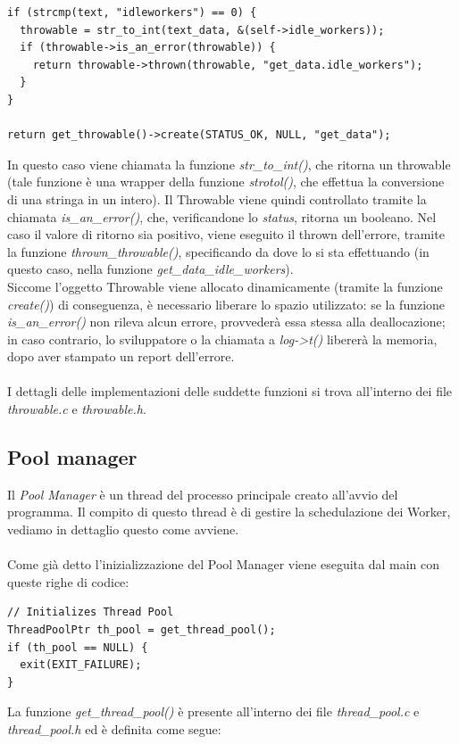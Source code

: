 \documentclass[italian]{tktltiki2}
\begin{document}
\begin{lstlisting}
if (strcmp(text, "idleworkers") == 0) {
  throwable = str_to_int(text_data, &(self->idle_workers));
  if (throwable->is_an_error(throwable)) {
    return throwable->thrown(throwable, "get_data.idle_workers");
  }
}

return get_throwable()->create(STATUS_OK, NULL, "get_data");
\end{lstlisting}
In questo caso viene chiamata la funzione \emph{str\_to\_int()}, che ritorna un throwable (tale funzione è una wrapper della funzione \emph{strotol()}, che effettua la conversione di una stringa in un intero). Il Throwable viene quindi controllato tramite la chiamata \emph{is\_an\_error()}, che, verificandone lo \emph{status}, ritorna un booleano. Nel caso il valore di ritorno sia positivo, viene eseguito il thrown dell'errore, tramite la funzione \emph{thrown\_throwable()}, specificando da dove lo si sta effettuando (in questo caso, nella funzione \emph{get\_data\_idle\_workers}).
\\
Siccome l'oggetto Throwable viene allocato dinamicamente (tramite la funzione \emph{create()}) di conseguenza, è necessario liberare lo spazio utilizzato: se la funzione \emph{is\_an\_error()} non rileva alcun errore, provvederà essa stessa alla deallocazione; in caso contrario, lo sviluppatore o la chiamata a \emph{log->t()} libererà la memoria, dopo aver stampato un report dell'errore.
\\\\
I dettagli delle implementazioni delle suddette funzioni si trova all'interno dei file \emph{throwable.c} e \emph{throwable.h}.
\subsection{Pool manager}
\label{ssec:pool}
Il \emph{Pool Manager} è un thread del processo principale creato all'avvio del programma. Il compito di questo thread è di gestire la schedulazione dei Worker, vediamo in dettaglio questo come avviene.\\\\ Come già detto l'inizializzazione del Pool Manager viene eseguita dal main con queste righe di codice:
\begin{lstlisting}
// Initializes Thread Pool
ThreadPoolPtr th_pool = get_thread_pool();
if (th_pool == NULL) {
  exit(EXIT_FAILURE);
}
\end{lstlisting}
La funzione \emph{get\_thread\_pool()} è presente all'interno dei file \emph{thread\_pool.c} e \emph{thread\_pool.h} ed è definita come segue:
\end{document}
